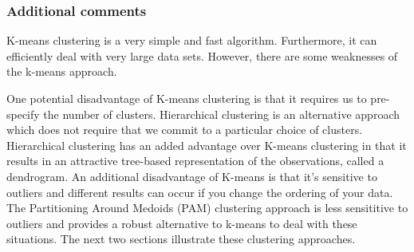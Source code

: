 \documentclass[]{book}
\newenvironment{Shaded}{\begin{snugshade}}{\end{snugshade}}
\newcommand{\CommentTok}[1]{\textcolor[rgb]{0.56,0.35,0.01}{\textit{#1}}}
\newcommand{\DataTypeTok}[1]{\textcolor[rgb]{0.13,0.29,0.53}{#1}}
\newcommand{\DecValTok}[1]{\textcolor[rgb]{0.00,0.00,0.81}{#1}}
\newcommand{\KeywordTok}[1]{\textcolor[rgb]{0.13,0.29,0.53}{\textbf{#1}}}
\newcommand{\NormalTok}[1]{#1}
\newcommand{\OperatorTok}[1]{\textcolor[rgb]{0.81,0.36,0.00}{\textbf{#1}}}
\newcommand{\StringTok}[1]{\textcolor[rgb]{0.31,0.60,0.02}{#1}}
\theoremstyle{definition}
\theoremstyle{definition}
\theoremstyle{definition}
\theoremstyle{remark}
\begin{document}
\begin{Shaded}
\end{Shaded}

\hypertarget{additional-comments}{%
\subsubsection{Additional comments}\label{additional-comments}}

K-means clustering is a very simple and fast algorithm. Furthermore, it
can efficiently deal with very large data sets. However, there are some
weaknesses of the k-means approach.

One potential disadvantage of K-means clustering is that it requires us
to pre-specify the number of clusters. Hierarchical clustering is an
alternative approach which does not require that we commit to a
particular choice of clusters. Hierarchical clustering has an added
advantage over K-means clustering in that it results in an attractive
tree-based representation of the observations, called a dendrogram. An
additional disadvantage of K-means is that it's sensitive to outliers
and different results can occur if you change the ordering of your data.
The Partitioning Around Medoids (PAM) clustering approach is less
sensititive to outliers and provides a robust alternative to k-means to
deal with these situations. The next two sections illustrate these
clustering approaches.
\end{document}
